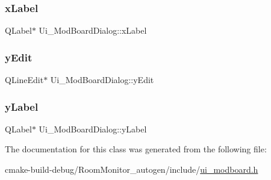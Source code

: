 \subsubsection{\texorpdfstring{x\+Label}{xLabel}}
{\footnotesize\ttfamily Q\+Label$\ast$ Ui\+\_\+\+Mod\+Board\+Dialog\+::x\+Label}

\mbox{\label{class_ui___mod_board_dialog_a19a782a76ad8b8d00a188d88c7641cfc}} 
\subsubsection{\texorpdfstring{y\+Edit}{yEdit}}
{\footnotesize\ttfamily Q\+Line\+Edit$\ast$ Ui\+\_\+\+Mod\+Board\+Dialog\+::y\+Edit}

\mbox{\label{class_ui___mod_board_dialog_ab79e64edca1b5e18c0f8134559dfe2ad}} 
\subsubsection{\texorpdfstring{y\+Label}{yLabel}}
{\footnotesize\ttfamily Q\+Label$\ast$ Ui\+\_\+\+Mod\+Board\+Dialog\+::y\+Label}



The documentation for this class was generated from the following file\+:\begin{DoxyCompactItemize}
\item 
cmake-\/build-\/debug/\+Room\+Monitor\+\_\+autogen/include/\hyperlink{ui__modboard_8h}{ui\+\_\+modboard.\+h}\end{DoxyCompactItemize}
